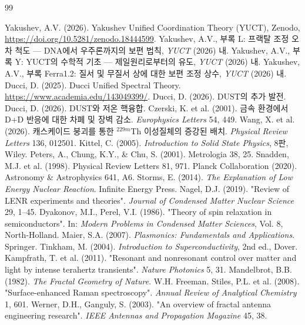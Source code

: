 \documentclass[11pt,a4paper]{article}
\theoremstyle{remark}
\begin{document}
	\begin{thebibliography}{99}
		
		 Yakushev, A.V. (2026). Yakushev Unified Coordination Theory (YUCT), Zenodo, \url{https://doi.org/10.5281/zenodo.18444599}.
		 Yakushev, A.V., 부록 L: 프랙탈 조정 오차 척도 — DNA에서 우주론까지의 보편 법칙, \emph{YUCT} (2026) 내.
		 Yakushev, A.V., 부록 Y: YUCT의 수학적 기초 — 제일원리로부터의 유도, \emph{YUCT} (2026) 내.
		 Yakushev, A.V., 부록 Ferra1.2: 질서 및 무질서 상에 대한 보편 조정 상수, \emph{YUCT} (2026) 내.
		 Ducci, D. (2025). Ducci Unified Spectral Theory. \url{https://www.academia.edu/143049399/}.
		 Ducci, D. (2026). DUST의 추가 발전.
		 Ducci, D. (2026). DUST와 저온 핵융합.
		 Czerski, K. et al. (2001). 금속 환경에서 D+D 반응에 대한 차폐 및 장벽 감소. \textit{Europhysics Letters} 54, 449.
		 Wang, X. et al. (2026). 캐스케이드 붕괴를 통한 \(^{229m}\)Th 이성질체의 증강된 배치. \textit{Physical Review Letters} 136, 012501.
		 Kittel, C. (2005). \textit{Introduction to Solid State Physics}, 8판, Wiley.
		 Peters, A., Chung, K.Y., \& Chu, S. (2001). Metrologia 38, 25.
		 Snadden, M.J. et al. (1998). Physical Review Letters 81, 971.
		 Planck Collaboration (2020). Astronomy \& Astrophysics 641, A6.
		 Storms, E. (2014). \textit{The Explanation of Low Energy Nuclear Reaction}. Infinite Energy Press.
		 Nagel, D.J. (2019). "Review of LENR experiments and theories". \textit{Journal of Condensed Matter Nuclear Science} 29, 1–45.
		 Dyakonov, M.I., Perel, V.I. (1986). "Theory of spin relaxation in semiconductors". In: \textit{Modern Problems in Condensed Matter Sciences}, Vol. 8, North‑Holland.
		 Maier, S.A. (2007). \textit{Plasmonics: Fundamentals and Applications}. Springer.
		 Tinkham, M. (2004). \textit{Introduction to Superconductivity}, 2nd ed., Dover.
		 Kampfrath, T. et al. (2011). "Resonant and nonresonant control over matter and light by intense terahertz transients". \textit{Nature Photonics} 5, 31.
		 Mandelbrot, B.B. (1982). \textit{The Fractal Geometry of Nature}. W.H. Freeman.
		 Stiles, P.L. et al. (2008). "Surface-enhanced Raman spectroscopy". \textit{Annual Review of Analytical Chemistry} 1, 601.
		 Werner, D.H., Ganguly, S. (2003). "An overview of fractal antenna engineering research". \textit{IEEE Antennas and Propagation Magazine} 45, 38.
	\end{thebibliography}
	
\end{document}
